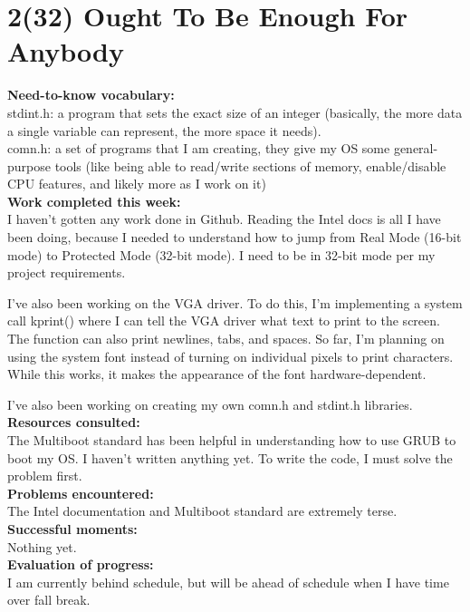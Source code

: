 \documentclass[11pt]{article}
\begin{document}
\section{2(32) Ought To Be Enough For Anybody}
\textbf{Need-to-know vocabulary:}\\
stdint.h: a program that sets the exact size of an integer (basically, the more data a single variable can represent, the more space it needs).\\
comn.h: a set of programs that I am creating, they give my OS some general-purpose tools (like being able to read/write sections of memory, enable/disable CPU features, and likely more as I work on it)\\
\textbf{Work completed this week:}\\
I haven't gotten any work done in Github. Reading the Intel docs is all I have been doing, because I needed to understand how to jump from Real Mode (16-bit mode) to Protected Mode (32-bit mode). I need to be in 32-bit mode per my project requirements.

I've also been working on the VGA driver. To do this, I'm implementing a system call kprint() where I can tell the VGA driver what text to print to the screen. The function can also print newlines, tabs, and spaces. So far, I'm planning on using the system font instead of turning on individual pixels to print characters. While this works, it makes the appearance of the font hardware-dependent.

I've also been working on creating my own comn.h and stdint.h libraries.\\
\textbf{Resources consulted:}\\
The Multiboot standard has been helpful in understanding how to use GRUB to boot my OS. I haven't written anything yet. To write the code, I must solve the problem first.\\
\textbf{Problems encountered:}\\
The Intel documentation and Multiboot standard are extremely terse.\\
\textbf{Successful moments:}\\
Nothing yet.\\
\textbf{Evaluation of progress:}\\
I am currently behind schedule, but will be ahead of schedule when I have time over fall break.
\end{document}
